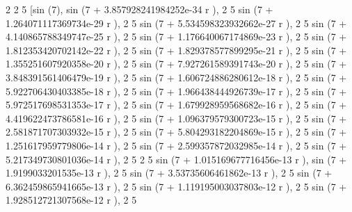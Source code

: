 \documentclass[a4paper,10pt]{article}
\begin{document}
\begin{eulernotebook}
\begin{eulercomment}
\begin{eulercomment}
\begin{eulercomment}
\begin{eulercomment}
\begin{eulercomment}
\begin{eulercomment}
\begin{eulercomment}
\begin{eulercomment}
\begin{eulercomment}
\begin{eulercomment}
\begin{eulercomment}
\begin{eulercomment}
\begin{eulercomment}
\begin{eulercomment}
\begin{eulercomment}
\begin{eulercomment}
\begin{eulercomment}
\begin{eulercomment}
\begin{eulercomment}
\begin{eulercomment}
\begin{eulercomment}
\begin{eulercomment}
\begin{eulercomment}
\begin{eulercomment}
\begin{eulercomment}
\begin{eulercomment}
\begin{eulercomment}
\begin{eulercomment}
\begin{euleroutput}
              2        2                            5
          [sin (7), sin (7 + 3.857928241984252e-34 r ), 
     2                            5
  sin (7 + 1.264071117369734e-29 r ), 
     2                            5
  sin (7 + 5.534598323932662e-27 r ), 
     2                            5
  sin (7 + 4.140865788349747e-25 r ), 
     2                            5
  sin (7 + 1.176640067174869e-23 r ), 
     2                            5
  sin (7 + 1.812353420702142e-22 r ), 
     2                            5
  sin (7 + 1.829378577899295e-21 r ), 
     2                            5
  sin (7 + 1.355251607920358e-20 r ), 
     2                            5
  sin (7 + 7.927261589391743e-20 r ), 
     2                            5
  sin (7 + 3.848391561406479e-19 r ), 
     2                            5
  sin (7 + 1.606724886280612e-18 r ), 
     2                            5
  sin (7 + 5.922706430403385e-18 r ), 
     2                            5
  sin (7 + 1.966438444926739e-17 r ), 
     2                            5
  sin (7 + 5.972517698531353e-17 r ), 
     2                            5
  sin (7 + 1.679928959568682e-16 r ), 
     2                            5
  sin (7 + 4.419622473786581e-16 r ), 
     2                            5
  sin (7 + 1.096379579300723e-15 r ), 
     2                            5
  sin (7 + 2.581871707303932e-15 r ), 
     2                            5
  sin (7 + 5.804293182204869e-15 r ), 
     2                            5
  sin (7 + 1.251617959779806e-14 r ), 
     2                            5
  sin (7 + 2.599357872032985e-14 r ), 
     2                            5
  sin (7 + 5.217349730801036e-14 r ), 
     2                            5      2                          5
  sin (7 + 1.015169677716456e-13 r ), sin (7 + 1.9199033201535e-13 r ), 
     2                           5
  sin (7 + 3.53735606461862e-13 r ), 
     2                            5
  sin (7 + 6.362459865941665e-13 r ), 
     2                            5
  sin (7 + 1.119195003037803e-12 r ), 
     2                            5
  sin (7 + 1.928512721307568e-12 r ), 
     2                            5

\end{euleroutput}
\end{eulercomment}
\end{eulercomment}
\end{eulercomment}
\end{eulercomment}
\end{eulercomment}
\end{eulercomment}
\end{eulercomment}
\end{eulercomment}
\end{eulercomment}
\end{eulercomment}
\end{eulercomment}
\end{eulercomment}
\end{eulercomment}
\end{eulercomment}
\end{eulercomment}
\end{eulercomment}
\end{eulercomment}
\end{eulercomment}
\end{eulercomment}
\end{eulercomment}
\end{eulercomment}
\end{eulercomment}
\end{eulercomment}
\end{eulercomment}
\end{eulercomment}
\end{eulercomment}
\end{eulercomment}
\end{eulercomment}
\end{eulernotebook}
\end{document}
